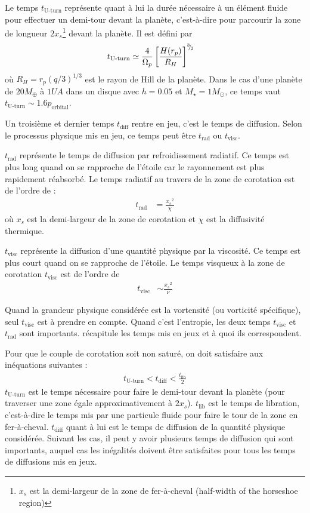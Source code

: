 Le temps $t_\text{U-turn}$ représente quant à lui la durée nécessaire à un élément fluide pour effectuer un demi-tour devant la
planète, c'est-à-dire pour parcourir la zone de longueur $2x_s$\footnote{$x_s$ est la demi-largeur de la zone de fer-à-cheval
(\og half-width of the horseshoe region\fg)} devant la planète. Il est défini par \citep[eq. (64)]{baruteau2008corotation}
\begin{align}
t_\text{U-turn} &\simeq \frac{4}{\Omega_p}\left[\frac{H(r_p)}{R_H}\right]^{{}^{3\!\!}/ _{\!2}}
\end{align}
où $R_H=r_p (q/3)^{1/3}$ est le rayon de Hill de la planète. Dans le cas d'une planète de $20\unit{M_\oplus}$ à $1\unit{UA}$ dans un disque avec $h=0.05$ et $M_\star=1M_\odot$, ce temps vaut $t_\text{U-turn} \sim 1.6 p_\text{orbital}$.

Un troisième et dernier temps $t_\text{diff}$ rentre en jeu, c'est le temps de diffusion. Selon le processus physique mis en
jeu, ce temps peut être $t_\text{rad}$ ou $t_\text{visc}$.

$t_\text{rad}$ représente le temps de diffusion par refroidissement radiatif. Ce temps est plus long quand on se rapproche de l'étoile car le rayonnement est plus rapidement réabsorbé. Le temps radiatif au travers de la zone de corotation est de l'ordre de :
\begin{align}
t_\text{rad} &= \frac{{x_s}^2}{\chi}
\end{align}
où $x_s$ est la demi-largeur de la zone de corotation et $\chi$ est la diffusivité thermique.
 
$t_\text{visc}$ représente la diffusion d'une quantité physique par la viscosité. Ce temps est plus court quand on se rapproche de l'étoile. Le temps visqueux à la zone de corotation $t_\text{visc}$ est  de l'ordre de \citep{masset2001coorbital, masset2002coorbital, ogilvie2003saturation}
\begin{align}
t_\text{visc} &\sim \frac{{x_s}^2}{\nu}
\end{align}

Quand la grandeur physique considérée est la vortensité (ou vorticité spécifique), seul $t_\text{visc}$ est à prendre en compte. Quand c'est l'entropie, les deux temps $t_\text{visc}$ et $t_\text{rad}$ sont importants.  récapitule les temps mis en jeux et à quoi ils correspondent.

\bigskip

Pour que le couple de corotation soit non saturé, on doit satisfaire aux inéquations suivantes \citep[eq. (31)]{baruteau2013recent} :
\begin{align}
t_\text{U-turn} < t_\text{diff} < \frac{t_\text{lib}}{2}
\end{align}
$t_\text{U-turn}$ est le temps nécessaire pour faire le demi-tour devant la planète (pour traverser une zone égale approximativement à $2x_s$). $t_\text{lib}$ est le temps de libration, c'est-à-dire le temps mis par une particule fluide pour faire le tour de la zone en fer-à-cheval. $t_\text{diff}$ quant à lui est le temps de diffusion de la quantité physique considérée. Suivant les cas, il peut y avoir plusieurs temps de diffusion qui sont importants, auquel cas les inégalités doivent être satisfaites pour tous les temps de diffusions mis en jeux.


